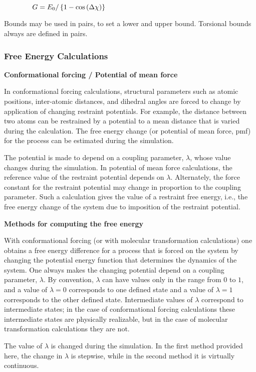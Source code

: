 $\qquad \qquad G=E_{0}/\left\{ 1-\cos \left( \Delta \chi \right) \right\}
\bigskip $

Bounds may be used in pairs, to set a lower and upper bound. Torsional
bounds always are defined in pairs.

\subsubsection{Free Energy Calculations}

{\bf Conformational forcing / Potential of mean force}

In conformational forcing calculations, structural parameters such as atomic
positions, inter-atomic distances, and dihedral angles are forced to change
by application of changing restraint potentials. For example, the distance
between two atoms can be restrained by a potential to a mean distance that
is varied during the calculation. The free energy change (or potential of
mean force, pmf) for the process can be estimated during the simulation.

The potential is made to depend on a coupling parameter, $\lambda $, whose
value changes during the simulation. In potential of mean force
calculations, the reference value of the restraint potential depends on $
\lambda $. Alternately, the force constant for the restraint potential may
change in proportion to the coupling parameter. Such a calculation gives the
value of a restraint free energy, i.e., the free energy change of the
syste\bigskip m due to imposition of the restraint potential.

{\bf Methods for computing the free energy}

With conformational forcing (or with molecular transformation calculations)
one obtains a free energy difference for a process that is forced on the
system by changing the potential energy function that determines the
dynamics of the system. One always makes the changing potential depend on a
coupling parameter, $\lambda $. By convention, $\lambda $ can have values
only in the range from $0$ to $1$, and a value of $\lambda =0$ corresponds
to one defined state and a value of $\lambda =1$ corresponds to the other
defined state. Intermediate values of $\lambda $ correspond to intermediate
states; in the case of conformational forcing calculations these
intermediate states are physically realizable, but in the case of molecular
transformation calculations they are not.

The value of $\lambda $ is changed during the simulation. In the first
method provided here, the change in $\lambda $ is stepwise, while in the
second method it is virtually continuous.\medskip

